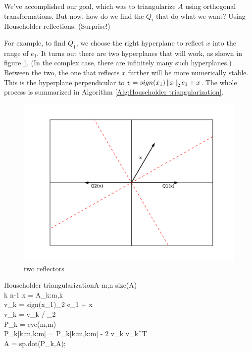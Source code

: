 We've accomplished our goal, which was to triangularize $A$ using orthogonal transformations. But now, how do we find the $Q_i$ that do what we want? Using Householder reflections. (Surprise!)

For example, to find $Q_1$, we choose the right hyperplane to reflect $x$ into the range of $e_1$. It turns out there are two hyperplanes that will work, as shown in figure \ref{fig:two reflectors}. (In the complex case, there are infinitely many such hyperplanes.) Between the two, the one that reflects $x$ further will be more numerically stable. This is the hyperplane perpendicular to \textbf{$v = sign(x_1)\left\lVert x\right\rVert_2 e_1 + x$}. The whole process is summarized in Algorithm \ref{Alg:Householder triangularization}.

\begin{figure}
	\centering
	\includegraphics[width= \textwidth]{fig2}
	\caption{two reflectors}
	\label{fig:two reflectors}
\end{figure}

\begin{pseudo}{Householder triangularization}{A}
\label{Alg:Householder triangularization}
m,n \GETS size(A)\\
\FOR k  \TO n-1 \DO
\BEGIN
   x = A_{k:m,k}\\
   v_k = sign(x_1)_2 e_1 + x\\
   v_k = v_k / _2\\
   P_k = eye(m,m)\\
   P_k[k:m,k:m] = P_k[k:m,k:m] - 2 v_k v_k^T\\
   A = sp.dot(P_k,A);
\END
\end{pseudo}

